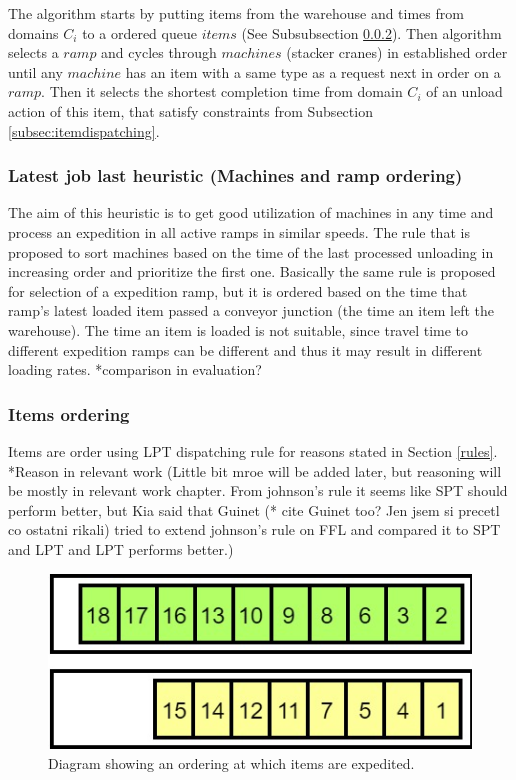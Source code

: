 \documentclass{ctuthesis}
\begin{document}
The algorithm starts by putting items from the warehouse and times from domains $C_i$ to a ordered queue $items$ (See Subsubsection \ref{subsubsec:itemsordering}). Then algorithm selects a $ramp$ and cycles through $machines$ (stacker cranes) in established order until any $machine$ has an item with a same type as a request next in order on a $ramp$. Then it selects the shortest completion time from domain $C_i$ of an unload action of this item, that satisfy constraints from Subsection \ref{subsec:itemdispatching}. 


\subsubsection{Latest job last heuristic (Machines and ramp ordering)}

The aim of this heuristic is to get good utilization of machines in any time and process an expedition in all active ramps in similar speeds. The rule that is proposed to sort machines based on the time of the last processed unloading in increasing order and prioritize the first one. 
Basically the same rule is proposed for selection of a expedition ramp, but it is ordered based on the time that ramp's latest loaded item passed a conveyor junction (the time an item left the warehouse). The time an item is loaded is not suitable, since travel time to different expedition ramps can be different and thus it may result in different loading rates. *comparison in evaluation?

\subsubsection{Items ordering}
\label{subsubsec:itemsordering}

Items are order using LPT dispatching rule for reasons stated in Section \ref{rules}. *Reason in relevant work (Little bit mroe will be added later, but reasoning will be mostly in relevant work chapter. From johnson's rule it seems like SPT should perform better, but Kia \cite{kia} said that Guinet (* cite Guinet too? Jen jsem si precetl co ostatni rikali) tried to extend johnson's rule on FFL and compared it to SPT and LPT and LPT performs better.)


\begin{figure}[h]
\includegraphics[width=0.8\linewidth]{order.jpg}
\caption{Diagram showing an ordering at which items are expedited.}
\label{order}
\end{figure}
\end{document}
